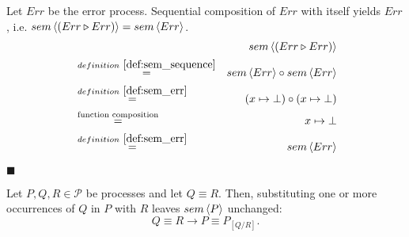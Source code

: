 \begin{myproof}
Let $Err$ be the error process. Sequential composition of $Err$ with itself yields $Err$, i.e. $sem \left\langle \left( Err \triangleright Err \right) \right\rangle = sem \left\langle Err \right\rangle$.
\begin{eqnarray*}
  & & \sem{\sequence{Err}{Err}} \\
    & \overset{\defref{def:sem_sequence}}{=} & \sem{Err} \circ \sem{Err} \\
    & \overset{\defref{def:sem_err}}{=} & \left( x \mapsto \bot \right) \circ \left( x \mapsto \bot \right) \\
    & \overset{\text{function composition}}{=} & x \mapsto \bot \\
    & \overset{\defref{def:sem_err}}{=} & \sem{Err}
\end{eqnarray*}

\hfill$\blacksquare$
\end{myproof}



\begin{theorem}
\label{thm:substitution_equivalence}
Let $P, Q, R \in \mathcal{P}$ be processes and let $Q \equiv R$. Then, substituting one or more occurrences of $Q$ in $P$ with $R$ leaves $sem \left\langle P \right\rangle$ unchanged:
  \begin{equation*}
    Q \equiv R \rightarrow P \equiv P_{\left[ Q / R \right]}.
  \end{equation*}
\end{theorem}


